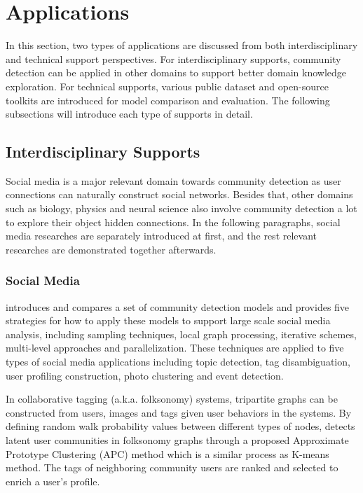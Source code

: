 \section{Applications}
In this section, two types of applications are discussed from both interdisciplinary  and technical support perspectives.  For interdisciplinary supports, community detection can be applied in other domains to support better domain knowledge exploration. For technical supports, various public dataset and open-source toolkits are introduced for model comparison and evaluation. The following subsections will introduce each type of supports in detail.

\subsection{Interdisciplinary Supports}
Social media is a major relevant domain towards community detection as user connections can naturally construct social networks. Besides that, other domains such as biology, physics and neural science also involve community detection a lot to explore their object hidden connections. In the following paragraphs, social media researches are separately introduced at first, and the rest relevant researches are demonstrated together afterwards.

\subsubsection{Social Media}

\cite{papadopoulos2012community} introduces and compares a set of community detection models and provides five strategies for how to apply these models to support large scale social media analysis, including sampling techniques, local graph processing, iterative schemes, multi-level approaches and parallelization. These techniques are applied to five types of social media applications including topic detection, tag disambiguation, user profiling construction, photo clustering and event detection. 


In collaborative tagging (a.k.a. folksonomy) systems, tripartite graphs can be constructed from users, images and tags given user behaviors in the systems. By defining random walk probability values between different types of nodes, \cite{xie2014community} detects latent user communities in folksonomy graphs through a proposed Approximate Prototype Clustering (APC) method which is a similar process as K-means method. The tags of neighboring community users are ranked and selected to enrich a user’s profile. 

